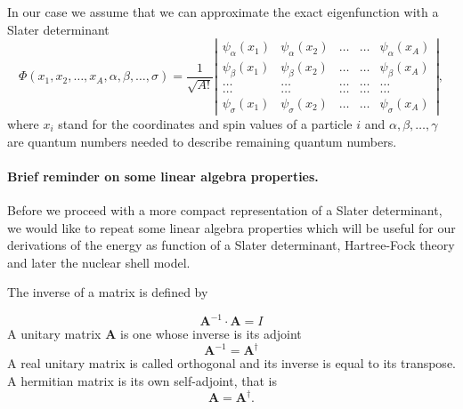 In our case we assume that  we can approximate the exact eigenfunction with a Slater determinant
\begin{equation}
   \Phi(x_1, x_2,\dots ,x_A,\alpha,\beta,\dots, \sigma)=\frac{1}{\sqrt{A!}}
\left| \begin{array}{ccccc} \psi_{\alpha}(x_1)& \psi_{\alpha}(x_2)& \dots & \dots & \psi_{\alpha}(x_A)\\
                            \psi_{\beta}(x_1)&\psi_{\beta}(x_2)& \dots & \dots & \psi_{\beta}(x_A)\\  
                            \dots & \dots & \dots & \dots & \dots \\
                            \dots & \dots & \dots & \dots & \dots \\
                     \psi_{\sigma}(x_1)&\psi_{\sigma}(x_2)& \dots & \dots & \psi_{\sigma}(x_A)\end{array} \right|, \label{eq:HartreeFockDet}
\end{equation}
where  $x_i$  stand for the coordinates and spin values of a particle $i$ and $\alpha,\beta,\dots, \gamma$ 
are quantum numbers needed to describe remaining quantum numbers.  

\paragraph{Brief reminder on some linear algebra properties.}
Before we proceed with a more compact representation of a Slater determinant, we would like to repeat some linear algebra properties which will be useful for our derivations of the energy as function of a Slater determinant, Hartree-Fock theory and later the nuclear shell model.

The inverse of a matrix is defined by

\[
\mathbf{A}^{-1} \cdot \mathbf{A} = I
\]
A unitary matrix $\mathbf{A}$ is one whose inverse is its adjoint
\[
\mathbf{A}^{-1}=\mathbf{A}^{\dagger}
\]
A real unitary matrix is called orthogonal and its inverse is equal to its transpose.
A hermitian matrix is its own self-adjoint, that  is
\[
\mathbf{A}=\mathbf{A}^{\dagger}. 
\]


